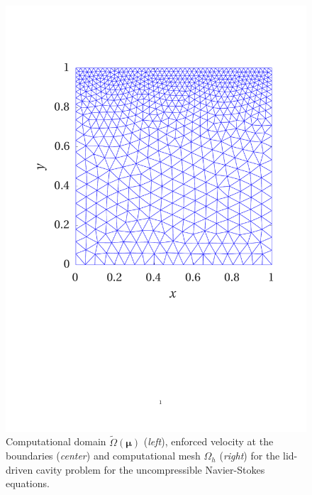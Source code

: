 \documentclass{elsarticle}
\numberwithin{equation}{section}
\theoremstyle{theorem}
\theoremstyle{definition}
\theoremstyle{remark}
\theoremstyle{proposition}
\numberwithin{figure}{section}
\newcommand{\wt}[1]{\widetilde{#1}}
\newcommand{\bg}[1]{\boldsymbol{#1}}
\begin{document}
\begin{figure}[t!]
\begin{minipage}{0.32\textwidth}
				\includegraphics[scale = 0.275, trim = {2cm 9cm 1.5cm 3.5cm}, clip]{dc_mesh}
			\end{minipage}
			
			\caption{Computational domain $\wt{\Omega}(\bg{\mu})$ (\emph{left}), enforced velocity at the boundaries (\emph{center}) and computational mesh $\Omega_h$ (\emph{right}) for the lid-driven cavity problem for the uncompressible Navier-Stokes equations.}
			\label{fig:dc-domain}
			

\end{figure}
\end{document}
